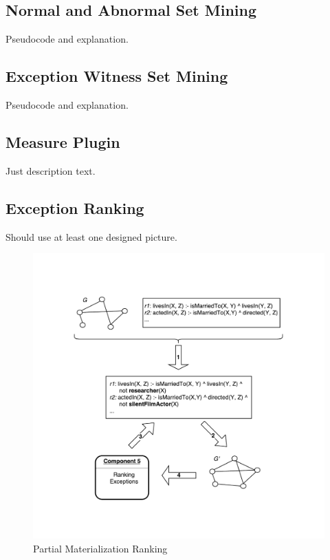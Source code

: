 \subsection{Normal and Abnormal Set Mining}

Pseudocode and explanation.

\subsection{Exception Witness Set Mining}

Pseudocode and explanation.

\subsection{Measure Plugin}

Just description text.

\subsection{Exception Ranking}

Should use at least one designed picture.

\begin{figure}[ht]
\centering
\includegraphics[width=1.0\textwidth]{figures/ranking}
\caption{Partial Materialization Ranking}
\label{pm_ranking}
\end{figure}

